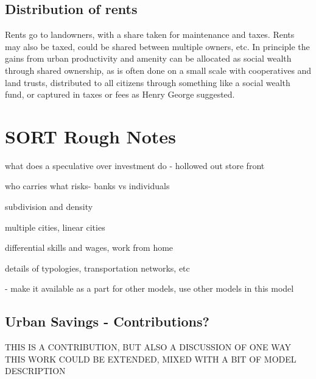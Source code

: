 
\subsection{Distribution of rents}
Rents go to landowners, with a share taken for maintenance and taxes.
Rents may also be taxed, could be shared between multiple owners, etc.
In principle the gains from urban productivity and amenity can be allocated as social wealth through shared ownership, as is often done on a small scale with cooperatives and land trusts, distributed to all citizens through something like a social wealth fund, or captured in taxes or fees as Henry George suggested. 




\section{SORT Rough Notes}
what does a speculative over investment do - hollowed out store front

who carries what risks- banks vs individuals

subdivision and density

multiple cities,
linear cities

differential skills and wages,
work from home

details of typologies, transportation networks, etc

- make it available as a part for other models, use other models in this model

\subsection{Urban Savings - Contributions?}
THIS IS A CONTRIBUTION, BUT ALSO A DISCUSSION OF ONE WAY THIS WORK COULD BE EXTENDED, MIXED WITH A BIT OF MODEL DESCRIPTION

